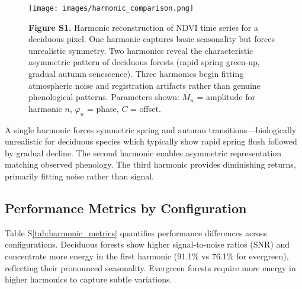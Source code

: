 \documentclass[utf8]{frontiers_suppmat}
\begin{document}
\begin{figure}[H]
    \centering
    \texttt{[image: images/harmonic\_comparison.png]}
    \caption{\textbf{Figure S1.} Harmonic reconstruction of NDVI time series for a deciduous pixel. One harmonic captures basic seasonality but forces unrealistic symmetry. Two harmonics reveal the characteristic asymmetric pattern of deciduous forests (rapid spring green-up, gradual autumn senescence). Three harmonics begin fitting atmospheric noise and registration artifacts rather than genuine phenological patterns. Parameters shown: $M_n$ = amplitude for harmonic $n$, $\varphi_n$ = phase, $C$ = offset.}
    \label{fig:harmonic_reconstruction}
\end{figure}

A single harmonic forces symmetric spring and autumn transitions—biologically unrealistic for deciduous species which typically show rapid spring flush followed by gradual decline. The second harmonic enables asymmetric representation matching observed phenology. The third harmonic provides diminishing returns, primarily fitting noise rather than signal.

\subsection{Performance Metrics by Configuration}

Table S\ref{tab:harmonic_metrics} quantifies performance differences across configurations. Deciduous forests show higher signal-to-noise ratios (SNR) and concentrate more energy in the first harmonic (91.1\% vs 76.1\% for evergreen), reflecting their pronounced seasonality. Evergreen forests require more energy in higher harmonics to capture subtle variations.
\end{document}

